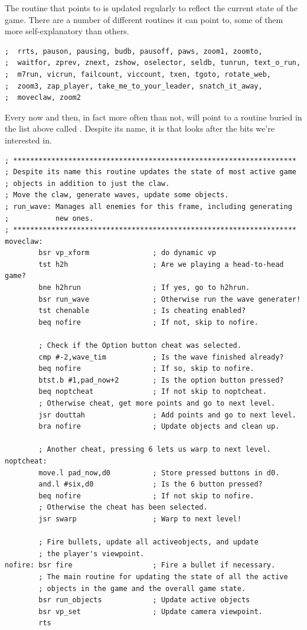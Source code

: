 The routine that  points to is updated regularly to reflect the current
state of the game. There are a number of different routines it can point to, some of 
them more self-explanatory than others.
\begin{lstlisting}
;  rrts, pauson, pausing, budb, pausoff, paws, zoom1, zoomto,
;  waitfor, zprev, znext, zshow, oselector, seldb, tunrun, text_o_run,
;  m7run, vicrun, failcount, viccount, txen, tgoto, rotate_web,
;  zoom3, zap_player, take_me_to_your_leader, snatch_it_away,
;  moveclaw, zoom2
\end{lstlisting}


Every now and then, in fact more often than not,  will point to a routine
buried in the list above called . Despite its name, it is  that looks after
the bits we're interested in.


\begin{lstlisting}
; *******************************************************************
; Despite its name this routine updates the state of most active game
; objects in addition to just the claw.
; Move the claw, generate waves, update some objects.
; run_wave: Manages all enemies for this frame, including generating
;           new ones.
; *******************************************************************
moveclaw:
        bsr vp_xform               ; do dynamic vp
        tst h2h                    ; Are we playing a head-to-head game?
        bne h2hrun                 ; If yes, go to h2hrun.
        bsr run_wave               ; Otherwise run the wave generater!
        tst chenable               ; Is cheating enabled?
        beq nofire                 ; If not, skip to nofire.

        ; Check if the Option button cheat was selected.
        cmp #-2,wave_tim           ; Is the wave finished already?
        beq nofire                 ; If so, skip to nofire.
        btst.b #1,pad_now+2        ; Is the option button pressed? 
        beq noptcheat              ; If not skip to noptcheat.
        ; Otherwise cheat, get more points and go to next level.
        jsr douttah                ; Add points and go to next level.
        bra nofire                 ; Update objects and clean up.
    
        ; Another cheat, pressing 6 lets us warp to next level.
noptcheat:
        move.l pad_now,d0          ; Store pressed buttons in d0.
        and.l #six,d0              ; Is the 6 button pressed?
        beq nofire                 ; If not skip to nofire.
        ; Otherwise the cheat has been selected.
        jsr swarp                  ; Warp to next level!

        ; Fire bullets, update all activeobjects, and update
        ; the player's viewpoint.
nofire: bsr fire                   ; Fire a bullet if necessary.
        ; The main routine for updating the state of all the active
        ; objects in the game and the overall game state.
        bsr run_objects            ; Update active objects
        bsr vp_set                 ; Update camera viewpoint.
        rts
\end{lstlisting}

